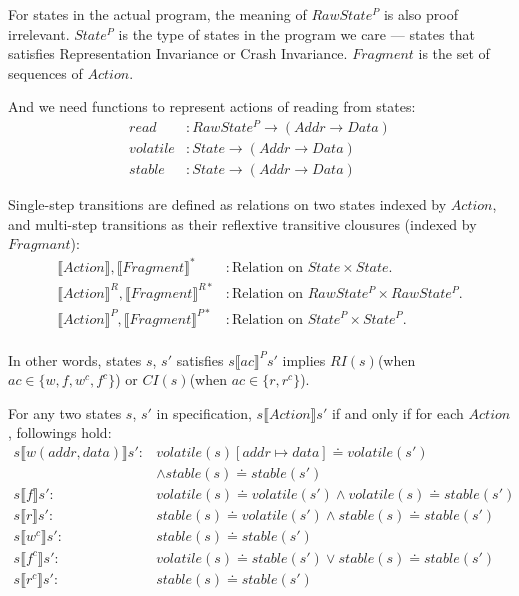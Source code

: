 \documentclass[a4paper,11pt]{article}
\theoremstyle{definition}
\begin{document}
For states in the actual program, the meaning of $\mathit{RawState^P}$ is also proof irrelevant. $\mathit{State^P}$ is the type of states in the program we care \---- states that satisfies Representation Invariance or Crash Invariance. $\mathit{Fragment}$ is the set of sequences of $\mathit{Action}$.

And we need functions to represent actions of reading from states:
\begin{align*}
	read &: \mathit{RawState^P} \to (\mathit{Addr} \to \mathit{Data})\\
	volatile &: \mathit{State} \to (\mathit{Addr} \to \mathit{Data})\\
	stable &: \mathit{State} \to (\mathit{Addr} \to \mathit{Data})
\end{align*}

\newpage

Single-step transitions are defined as relations on two states indexed by $\mathit{Action}$, and multi-step transitions as their reflextive transitive clousures (indexed by $\mathit{Fragmant}$):
\begin{align*}
	\llbracket \mathit{Action} \rrbracket, \llbracket \mathit{Fragment} \rrbracket^* &: \text{Relation on $\mathit{State \times State}$.}\\
	\llbracket \mathit{Action} \rrbracket^R, \llbracket \mathit{Fragment} \rrbracket^{R*} &: \text{Relation on $\mathit{RawState^P \times RawState^P}$.}\\
	\llbracket \mathit{Action} \rrbracket^P, \llbracket \mathit{Fragment} \rrbracket^{P*} &: \text{Relation on $\mathit{State^P \times State^P}$.}\\
\end{align*}

In other words, states $s$, $s'$ satisfies $s \llbracket \mathit{ac} \rrbracket^P s'$ implies $\mathit{RI(s)}$(when $\mathit{ac} \in \{w, f, w^c, f^c\}$) or $\mathit{CI(s)}$(when $\mathit{ac} \in \{r, r^c\}$).

For any two states $s$, $s'$ in specification, $s \llbracket \mathit{Action} \rrbracket s'$ if and only if for each $\mathit{Action}$, followings hold:
\begin{align*}
	s \llbracket w(addr, data) \rrbracket s' :{}& \mathit{volatile(s)[addr \mapsto data]} \doteq \mathit{volatile(s')}\\
	& \land stable(s) \doteq stable(s')\\
	s \llbracket f \rrbracket s' :{}& \mathit{volatile(s)} \doteq \mathit{volatile(s')} \land \mathit{volatile(s)} \doteq \mathit{stable(s')}\\
	s \llbracket r \rrbracket s' :{}& \mathit{stable(s)} \doteq \mathit{volatile(s')} \land \mathit{stable(s)} \doteq \mathit{stable(s')}\\
	s \llbracket w^c \rrbracket s' :{}& \mathit{stable(s)} \doteq \mathit{stable(s')}\\
	s \llbracket f^c \rrbracket s' :{}& \mathit{volatile(s)} \doteq \mathit{stable(s')} \lor \mathit{stable(s)} \doteq \mathit{stable(s')}\\
	s \llbracket r^c \rrbracket s' :{}& \mathit{stable(s)} \doteq \mathit{stable(s')}
\end{align*}
\end{document}
